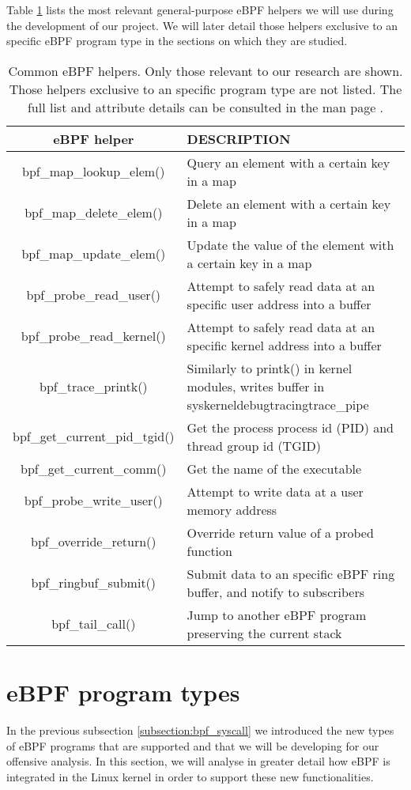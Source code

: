 Table \ref{table:ebpf_helpers} lists the most relevant general-purpose eBPF helpers we will use during the development of our project. We will later detail those helpers exclusive to an specific eBPF program type in the sections on which they are studied.

\begin{table}[htbp]
\begin{tabular}{|c|>{\centering\arraybackslash}p{10cm}|}
\hline
eBPF helper & DESCRIPTION\\
\hline
\hline
bpf\_map\_lookup\_elem() & Query an element with a certain key in a map\\
\hline
bpf\_map\_delete\_elem() & Delete an element with a certain key in a map\\
\hline
bpf\_map\_update\_elem() & Update the value of the element with a certain key in a map\\
\hline
bpf\_probe\_read\_user() & Attempt to safely read data at an specific user address into a buffer\\
\hline
bpf\_probe\_read\_kernel() & Attempt to safely read data at an specific kernel address into a buffer\\
\hline
bpf\_trace\_printk() & Similarly to printk() in kernel modules, writes buffer in \/sys\/kernel\/debug\/tracing\/trace\_pipe\\
\hline
bpf\_get\_current\_pid\_tgid() & Get the process process id (PID) and thread group id (TGID)\\
\hline
bpf\_get\_current\_comm() & Get the name of the executable\\
\hline
bpf\_probe\_write\_user() & Attempt to write data at a user memory address\\
\hline
bpf\_override\_return() & Override return value of a probed function\\
\hline
bpf\_ringbuf\_submit() & Submit data to an specific eBPF ring buffer, and notify to subscribers\\
\hline
bpf\_tail\_call() & Jump to another eBPF program preserving the current stack\\
\hline
\end{tabular}
\caption{Common eBPF helpers. Only those relevant to our research are shown. Those helpers exclusive to an specific program type are not listed. The full list and attribute details can be consulted in the man page \cite{ebpf_helpers}.}
\label{table:ebpf_helpers}
\end{table}


\section{eBPF program types} \label{section:ebpf_prog_types}
In the previous subsection \ref{subsection:bpf_syscall} we introduced the new types of eBPF programs that are supported and that we will be developing for our offensive analysis. In this section, we will analyse in greater detail how eBPF is integrated in the Linux kernel in order to support these new functionalities.

